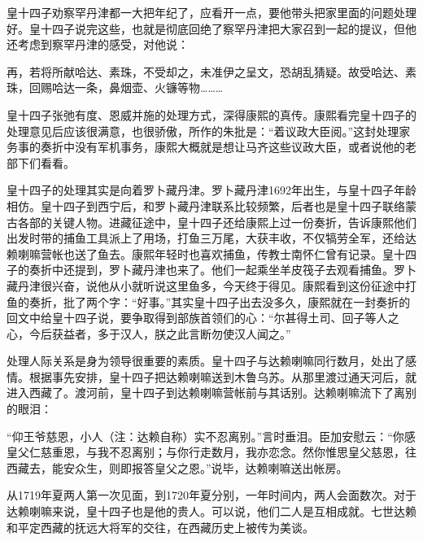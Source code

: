 
皇十四子劝察罕丹津都一大把年纪了，应看开一点，要他带头把家里面的问题处理好。皇十四子说完这些，也就是彻底回绝了察罕丹津把大家召到一起的提议，但他还考虑到察罕丹津的感受，对他说：



\begin{bookquote}再，若将所献哈达、素珠，不受却之，未准伊之呈文，恐胡乱猜疑。故受哈达、素珠，回赐哈达一条，鼻烟壶、火镰等物………\end{bookquote}


皇十四子张弛有度、恩威并施的处理方式，深得康熙的真传。康熙看完皇十四子的处理意见后应该很满意，也很骄傲，所作的朱批是：“着议政大臣阅。”这封处理家务事的奏折中没有军机事务，康熙大概就是想让马齐这些议政大臣，或者说他的老部下们看看。



皇十四子的处理其实是向着罗卜藏丹津。罗卜藏丹津1692年出生，与皇十四子年龄相仿。皇十四子到西宁后，和罗卜藏丹津联系比较频繁，后者也是皇十四子联络蒙古各部的关键人物。进藏征途中，皇十四子还给康熙上过一份奏折，告诉康熙他们出发时带的捕鱼工具派上了用场，打鱼三万尾，大获丰收，不仅犒劳全军，还给达赖喇嘛营帐也送了鱼去。康熙年轻时也喜欢捕鱼，传教士南怀仁曾有记录。皇十四子的奏折中还提到，罗卜藏丹津也来了。他们一起乘坐羊皮筏子去观看捕鱼。罗卜藏丹津很兴奋，说他从小就听说这里鱼多，今天终于得见。康熙看到这份征途中打鱼的奏折，批了两个字：“好事。”其实皇十四子出去没多久，康熙就在一封奏折的回文中给皇十四子说，要争取得到部族首领们的心：“尔甚得土司、回子等人之心，今后获益者，多于汉人，朕之此言断勿使汉人闻之。”



处理人际关系是身为领导很重要的素质。皇十四子与达赖喇嘛同行数月，处出了感情。根据事先安排，皇十四子把达赖喇嘛送到木鲁乌苏。从那里渡过通天河后，就进入西藏了。渡河前，皇十四子到达赖喇嘛营帐前与其话别。达赖喇嘛流下了离别的眼泪：



\begin{bookquote}“仰王爷慈恩，小人（注：达赖自称）实不忍离别。”言时垂泪。臣加安慰云：“你感皇父仁慈重恩，与我不忍离别；与你行走数月，我亦恋念。然你惟思皇父慈恩，往西藏去，能安众生，则即报答皇父之恩。”说毕，达赖喇嘛送出帐房。\end{bookquote}


从1719年夏两人第一次见面，到1720年夏分别，一年时间内，两人会面数次。对于达赖喇嘛来说，皇十四子也是他的贵人。可以说，他们二人是互相成就。七世达赖和平定西藏的抚远大将军的交往，在西藏历史上被传为美谈。


